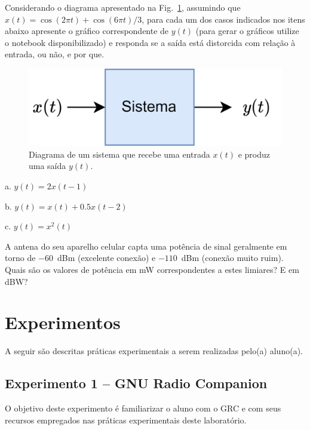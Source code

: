 \documentclass[12pt,addpoints]{exam}
\begin{document}
\begin{questions}
 \question Considerando o diagrama apresentado na Fig.~\ref{fig:sistema}, assumindo que $x(t) = \cos(2\pi t) + \cos(6\pi t)/3$, para cada um dos casos indicados nos itens abaixo apresente o gráfico correspondente de $y(t)$ (para gerar o gráficos utilize o notebook disponibilizado) e responda se a saída está distorcida com relação à entrada, ou não, e por que.
 
 \begin{figure}[h]
        \centering
        \includegraphics[width=0.35\linewidth]{./Figuras/Labo1Fig2.png}
        \caption{Diagrama de um sistema que recebe uma entrada $x(t)$ e produz uma saída $y(t)$.}
        \label{fig:sistema}
\end{figure}

a. $y(t) = 2x(t-1)$

b. $y(t) = x(t) + 0.5x(t-2)$

c. $y(t) = x^2(t)$

 \question A antena do seu aparelho celular capta uma potência de sinal geralmente em torno de $-60$~dBm (excelente conexão) e $-110$~dBm (conexão muito ruim). Quais são os valores de potência em mW correspondentes a estes limiares? E em dBW?
  \end{questions}


\section{Experimentos}

A seguir são descritas práticas experimentais a serem realizadas pelo(a) aluno(a). 

\subsection{Experimento 1 -- GNU Radio Companion}

O objetivo deste experimento é familiarizar o aluno com o GRC e com seus recursos empregados nas práticas experimentais deste laboratório.
\end{document}

